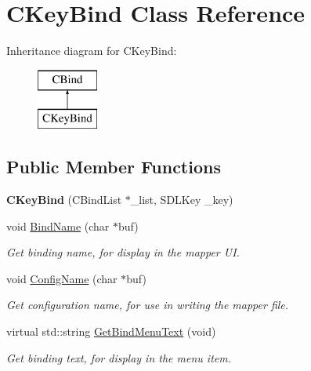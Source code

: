 \hypertarget{classCKeyBind}{\section{C\-Key\-Bind Class Reference}
\label{classCKeyBind}
}
Inheritance diagram for C\-Key\-Bind\-:\begin{figure}[H]
\begin{center}
\leavevmode
\includegraphics[height=2.000000cm]{classCKeyBind}
\end{center}
\end{figure}
\subsection*{Public Member Functions}
\begin{DoxyCompactItemize}
\item 
\hypertarget{classCKeyBind_ace188d08c2721d5f5074cdbd0e52b681}{{\bfseries C\-Key\-Bind} (C\-Bind\-List $\ast$\-\_\-list, S\-D\-L\-Key \-\_\-key)}\label{classCKeyBind_ace188d08c2721d5f5074cdbd0e52b681}

\item 
\hypertarget{classCKeyBind_a35652e64bf1da0c2477e6e235a4d8aec}{void \hyperlink{classCKeyBind_a35652e64bf1da0c2477e6e235a4d8aec}{Bind\-Name} (char $\ast$buf)}\label{classCKeyBind_a35652e64bf1da0c2477e6e235a4d8aec}

\begin{DoxyCompactList}\small\item\em Get binding name, for display in the mapper U\-I. \end{DoxyCompactList}\item 
\hypertarget{classCKeyBind_a25c924a9b89ff14424899b1779bc70de}{void \hyperlink{classCKeyBind_a25c924a9b89ff14424899b1779bc70de}{Config\-Name} (char $\ast$buf)}\label{classCKeyBind_a25c924a9b89ff14424899b1779bc70de}

\begin{DoxyCompactList}\small\item\em Get configuration name, for use in writing the mapper file. \end{DoxyCompactList}\item 
\hypertarget{classCKeyBind_a8540f8318b4290091b67f026b07efe73}{virtual std\-::string \hyperlink{classCKeyBind_a8540f8318b4290091b67f026b07efe73}{Get\-Bind\-Menu\-Text} (void)}\label{classCKeyBind_a8540f8318b4290091b67f026b07efe73}

\begin{DoxyCompactList}\small\item\em Get binding text, for display in the menu item. \end{DoxyCompactList}\end{DoxyCompactItemize}
